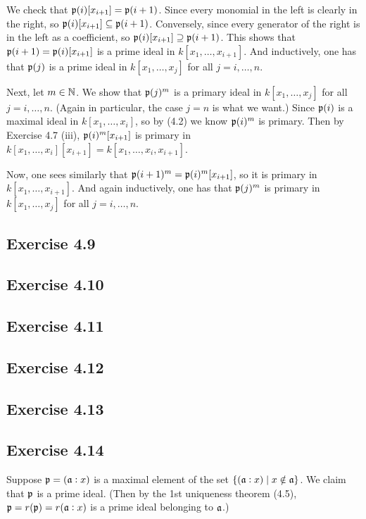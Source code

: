 \documentclass[../A&R.tex]{subfiles}
\begin{document}
We check that $\mathfrak{p}(i) [x_{i+1}] = \mathfrak{p}(i+1)$. Since every monomial in the left is clearly in the right, so $\mathfrak{p}(i) [x_{i+1}] \subseteq \mathfrak{p}(i+1)$. Conversely, since every generator of the right is in the left as a coefficient, so $\mathfrak{p}(i) [x_{i+1}] \supseteq \mathfrak{p}(i+1)$. This shows that $\mathfrak{p}(i+1) = \mathfrak{p}(i) [x_{i+1}]$ is a prime ideal in $k[x_1,\ldots,x_{i+1}]$. And inductively, one has that $\mathfrak{p}(j)$ is a prime ideal in $k[x_1,\ldots,x_j]$ for all $j=i,\ldots,n$.

Next, let $m\in\mathbb{N}$. We show that $\mathfrak{p}(j)^m$ is a primary ideal in $k[x_1,\ldots,x_j]$ for all $j=i,\ldots,n$. (Again in particular, the case $j=n$ is what we want.) Since $\mathfrak{p}(i)$ is a maximal ideal in $k[x_1,\ldots,x_i]$, so by (4.2) we know $\mathfrak{p}(i)^m$ is primary. Then by Exercise 4.7 (iii), $\mathfrak{p}(i)^m [x_{i+1}]$ is primary in $k[x_1,\ldots,x_i][x_{i+1}] = k[x_1,\ldots,x_i,x_{i+1}]$.

Now, one sees similarly that $\mathfrak{p}(i+1)^m = \mathfrak{p}(i)^m [x_{i+1}]$, so it is primary in $k[x_1,\ldots,x_{i+1}]$. And again inductively, one has that $\mathfrak{p}(j)^m$ is primary in $k[x_1,\ldots,x_j]$ for all $j=i,\ldots,n$.

\subsection*{Exercise 4.9}

\subsection*{Exercise 4.10}

\subsection*{Exercise 4.11}

\subsection*{Exercise 4.12}

\subsection*{Exercise 4.13}

\subsection*{Exercise 4.14}

Suppose $\mathfrak{p} = (\mathfrak{a}:x)$ is a maximal element of the set $\{ (\mathfrak{a}:x) \mid x \notin \mathfrak{a} \}$. We claim that $\mathfrak{p}$ is a prime ideal. (Then by the 1st uniqueness theorem (4.5), $\mathfrak{p} = r(\mathfrak{p}) = r(\mathfrak{a}:x)$ is a prime ideal belonging to $\mathfrak{a}$.)
\end{document}

